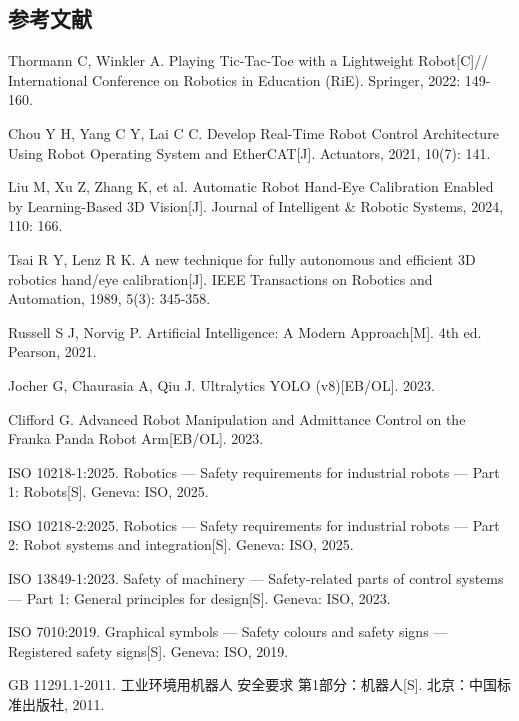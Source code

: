 \documentclass[a4paper, 12pt, oneside]{ctexart}
\begin{document}
\subsection*{参考文献}

{
\small
\begin{enumerate}[label={[\arabic*]}, leftmargin=3em, itemsep=0pt, parsep=2pt]
\item Thormann C, Winkler A. Playing Tic-Tac-Toe with a Lightweight Robot[C]// International Conference on Robotics in Education (RiE). Springer, 2022: 149-160.
\item Chou Y H, Yang C Y, Lai C C. Develop Real-Time Robot Control Architecture Using Robot Operating System and EtherCAT[J]. Actuators, 2021, 10(7): 141.
\item Liu M, Xu Z, Zhang K, et al. Automatic Robot Hand-Eye Calibration Enabled by Learning-Based 3D Vision[J]. Journal of Intelligent \& Robotic Systems, 2024, 110: 166.
\item Tsai R Y, Lenz R K. A new technique for fully autonomous and efficient 3D robotics hand/eye calibration[J]. IEEE Transactions on Robotics and Automation, 1989, 5(3): 345-358.
\item Russell S J, Norvig P. Artificial Intelligence: A Modern Approach[M]. 4th ed. Pearson, 2021.
\item Jocher G, Chaurasia A, Qiu J. Ultralytics YOLO (v8)[EB/OL]. 2023.
\item Clifford G. Advanced Robot Manipulation and Admittance Control on the Franka Panda Robot Arm[EB/OL]. 2023.
\item ISO 10218-1:2025. Robotics --- Safety requirements for industrial robots --- Part 1: Robots[S]. Geneva: ISO, 2025.
\item ISO 10218-2:2025. Robotics --- Safety requirements for industrial robots --- Part 2: Robot systems and integration[S]. Geneva: ISO, 2025.
\item ISO 13849-1:2023. Safety of machinery --- Safety-related parts of control systems --- Part 1: General principles for design[S]. Geneva: ISO, 2023.
\item ISO 7010:2019. Graphical symbols --- Safety colours and safety signs --- Registered safety signs[S]. Geneva: ISO, 2019.
\item GB 11291.1-2011. 工业环境用机器人 安全要求 第1部分：机器人[S]. 北京：中国标准出版社, 2011.

\end{enumerate}}
\end{document}
